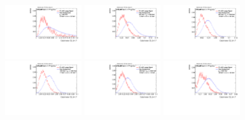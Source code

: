 \begin{figure}[H]
\includegraphics[width=0.3\textwidth]{sascha_input/Appendix/Distributions/w/distributions/beta17/h_recoJet_C2_17_bin1.pdf} \hspace{1mm}
\includegraphics[width=0.3\textwidth]{sascha_input/Appendix/Distributions/w/distributions/beta17/h_recoJet_C2_17_bin2.pdf} \hspace{1mm}
\includegraphics[width=0.3\textwidth]{sascha_input/Appendix/Distributions/w/distributions/beta17/h_recoJet_C2_17_bin3.pdf} 
\bigskip
\includegraphics[width=0.3\textwidth]{sascha_input/Appendix/Distributions/w/distributions/beta17/h_recoJet_C2_17_bin4.pdf} \hspace{1mm}
\includegraphics[width=0.3\textwidth]{sascha_input/Appendix/Distributions/w/distributions/beta17/h_recoJet_C2_17_bin5.pdf} \hspace{1mm}
\includegraphics[width=0.3\textwidth]{sascha_input/Appendix/Distributions/w/distributions/beta17/h_recoJet_C2_17_bin6.pdf}

\end{figure}
